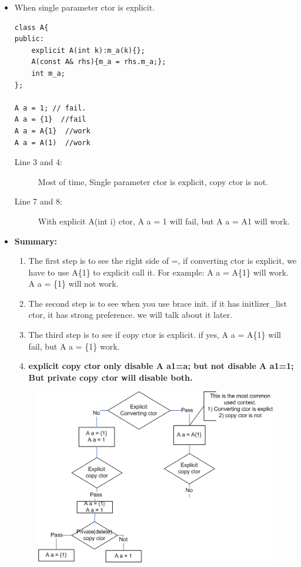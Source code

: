 \documentclass[a4paper,11pt,twoside]{book}
\begin{document}
\begin{itemize}
	\item  When single parameter ctor is explicit.
\begin{lstlisting}
class A{
public:
	explicit A(int k):m_a(k){};
	A(const A& rhs){m_a = rhs.m_a;};
	int m_a;
};
	
A a = 1; // fail. 
A a = {1}  //fail
A a = A{1}  //work
A a = A(1)  //work
\end{lstlisting}
	\begin{description}
		\item[Line 3 and 4:] Most of time, Single parameter ctor is explicit, copy ctor is not.
		
		\item[Line 7 and 8:] With explicit A(int i) ctor, A a = 1 will fail, but A a = A{1} will work.
	\end{description}


\item \textbf{Summary:}
\begin{enumerate}
	\item The first step is to see the right side of =, if converting ctor is explicit, we have to use A\{1\} to explicit call it. For example: A a = A\{1\} will work. A a = \{1\} will not work. 
	
	\item The second step is to see when you use brace init. if it has initlizer\_list ctor, it has strong preference. we will talk about it later.
	
	\item The third step is to see if copy ctor is explicit. if yes, A a = A\{1\} will fail, but A a = \{1\} work.
	
	\item \textbf{explicit copy ctor only disable A a1=a; but not disable A a1=1; But private copy ctor will disable both.}
	
\end{enumerate}

\begin{figure}[h]
	\centering
	\includegraphics[width=0.7\linewidth]{pics/copy_init.png}
	\caption{}
	\label{Explicit and init }
\end{figure}


\end{itemize}
\end{document}
